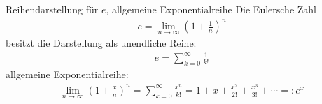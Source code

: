 \begin{karte}{Reihendarstellung für \(e\), allgemeine Exponentialreihe}
	Die Eulersche Zahl
	\begin{align}
		e=\lim_{n\to\infty}{\left(1+\frac{1}{n}\right)}^n
	\end{align}
	besitzt die Darstellung als unendliche Reihe:
	\begin{align}
		e=\sum_{k=0}^{\infty}\frac{1}{k!}
	\end{align}
	allgemeine Exponentialreihe:
	\begin{align}
		\lim_{n\to\infty}{\left(1+\frac{x}{n}\right)}^n=\sum_{k=0}^{\infty}\frac{x^n}{k!}=1+x+\frac{x^2}{2!}+\frac{x^3}{3!}+\cdots=:e^x
	\end{align}
\end{karte}
